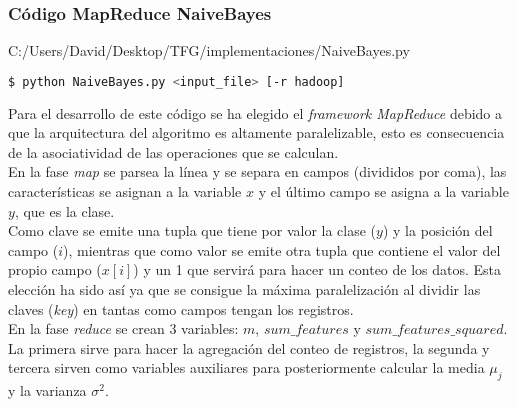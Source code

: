 \subsubsection*{Código MapReduce NaiveBayes}

                {C:/Users/David/Desktop/TFG/implementaciones/NaiveBayes.py}
                  
\begin{lstlisting}[language=bash, numbers=none]
$ python NaiveBayes.py <input_file> [-r hadoop]
\end{lstlisting}

Para el desarrollo de este código se ha elegido el \textit{framework MapReduce} debido a que la arquitectura del
algoritmo es altamente paralelizable, esto es consecuencia de la asociatividad de las operaciones que se calculan.\\
En la fase \textit{map} se parsea la línea y se separa en campos (divididos por coma), las características se 
asignan a la variable $x$ y el último campo se asigna a la variable $y$, que es la clase.\\
Como clave se emite una tupla que tiene por valor la clase ($y$) y la posición del campo ($i$), mientras que
como valor se emite otra tupla que contiene el valor del propio campo ($x[i]$) y un 1 que servirá para hacer
un conteo de los datos. Esta elección ha sido así ya que se consigue la máxima paralelización al dividir las 
claves (\textit{key}) en tantas como campos tengan los registros.\\
En la fase \textit{reduce} se crean 3 variables: $m$, $sum\_features$ y $sum\_features\_squared$. La primera sirve
para hacer la agregación del conteo de registros, la segunda y tercera sirven como variables auxiliares para 
posteriormente calcular la media $\mu_j$ y la varianza $\sigma^2$.
                    
\clearpage
